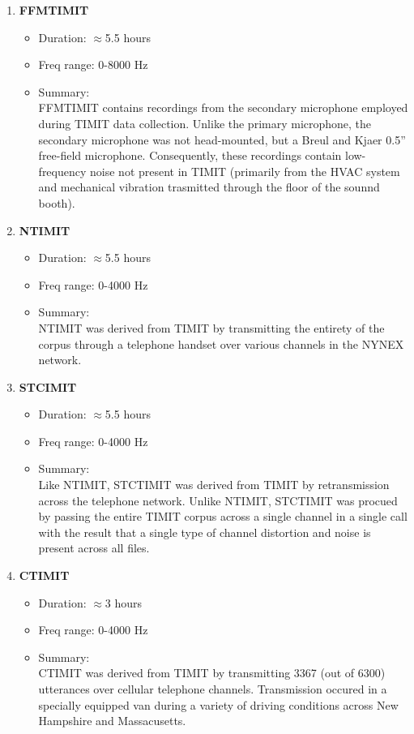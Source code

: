 \documentclass[12pt]{article}
\begin{document}
\begin{enumerate}
  \item {\bf FFMTIMIT} \\
    \begin{itemize}
        \item Duration: $\approx$5.5 hours
        \item Freq range: 0-8000 Hz
        \item Summary:\\
          FFMTIMIT contains recordings from the secondary microphone employed during TIMIT data collection. Unlike the primary microphone, the secondary microphone was not head-mounted, but a Breul and Kjaer 0.5'' free-field microphone. Consequently, these recordings contain low-frequency noise not present in TIMIT (primarily from the HVAC system and mechanical vibration trasmitted through the floor of the sounnd booth).
    \end{itemize}

  \item {\bf NTIMIT} \\
    \begin{itemize}
        \item Duration: $\approx$5.5 hours
        \item Freq range: 0-4000 Hz
        \item Summary: \\
          NTIMIT was derived from TIMIT by transmitting the entirety of the corpus through a telephone handset over various channels in the NYNEX network. 
    \end{itemize}

  \item {\bf STCIMIT} \\
    \begin{itemize}
        \item Duration: $\approx$5.5 hours
        \item Freq range: 0-4000 Hz
        \item Summary: \\
          Like NTIMIT, STCTIMIT was derived from TIMIT by retransmission across the telephone network. Unlike NTIMIT, STCTIMIT was procued by passing the entire TIMIT corpus across a single channel in a single call with the result that a single type of channel distortion and noise is present across all files.
    \end{itemize}

  \item {\bf CTIMIT} \\
    \begin{itemize}
        \item Duration: $\approx$3 hours
        \item Freq range: 0-4000 Hz
        \item Summary: \\
          CTIMIT was derived from TIMIT by transmitting 3367 (out of 6300) utterances over cellular telephone channels. Transmission occured in a specially equipped van during a variety of driving conditions across New Hampshire and Massacusetts.
    \end{itemize}


\end{enumerate}
\end{document}
